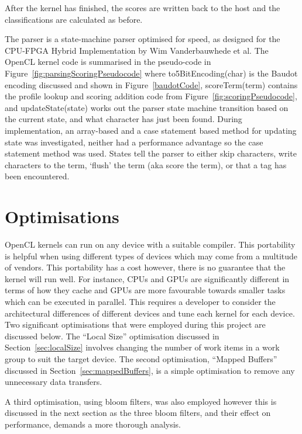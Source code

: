 After the kernel has finished, the scores are written back to the host and the
classifications are calculated as before.

The parser is a state-machine parser optimised for speed, as designed for the
CPU-FPGA Hybrid Implementation \cite{HybridCPUFPGA} by Wim Vanderbauwhede et al.
The OpenCL kernel code is summarised in the pseudo-code in
Figure~\ref{fig:parsingScoringPseudocode} where to5BitEncoding(char) is the
Baudot encoding discussed and shown in Figure~\ref{baudotCode}, scoreTerm(term)
contains the profile lookup and scoring addition code from
Figure~\ref{fig:scoringPseudocode}, and updateState(state) works out the parser
state machine transition based on the current state, and what character has just
been found. During implementation, an array-based and a case statement based
method for updating state was investigated, neither had a performance advantage
so the case statement method was used. States tell the parser to either skip
characters, write characters to the term, `flush' the term (aka score the term),
or that a tag has been encountered.

\section{Optimisations}

OpenCL kernels can run on any device with a suitable compiler. This portability
is helpful when using different types of devices which may come from a multitude
of vendors. This portability has a cost however, there is no guarantee that the
kernel will run well. For instance, CPUs and GPUs are significantly different in
terms of how they cache and GPUs are more favourable towards smaller tasks which
can be executed in parallel. This requires a developer to consider the
architectural differences of different devices and tune each kernel for each
device. Two significant optimisations that were employed during this project are
discussed below. The ``Local Size'' optimisation discussed in
Section~\ref{sec:localSize} involves changing the number of work items in a work
group to suit the target device. The second optimisation, ``Mapped Buffers''
discussed in Section~\ref{sec:mappedBuffers}, is a simple optimisation to remove
any unnecessary data transfers.

A third optimisation, using bloom filters, was also employed however this is
discussed in the next section as the three bloom filters, and their effect on
performance, demands a more thorough analysis.

